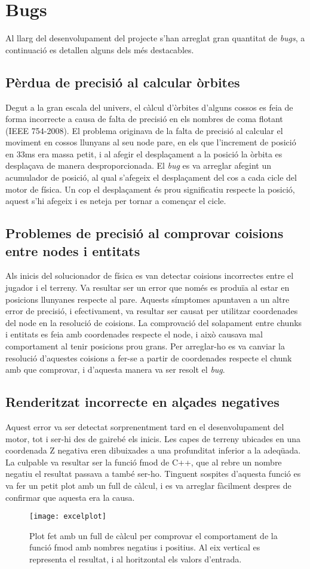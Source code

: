 \section{Bugs}
Al llarg del desenvolupament del projecte s'han arreglat gran quantitat de \textit{bugs}, a continuació es detallen alguns dels més destacables.
\subsection{Pèrdua de precisió al calcular òrbites}
Degut a la gran escala del univers, el càlcul d'òrbites d'alguns cossos es feia de forma incorrecte a causa de falta de precisió en els nombres de coma flotant (IEEE 754-2008).
El problema originava de la falta de precisió al calcular el moviment en cossos llunyans al seu node pare, en els que l'increment de posició en 33ms era massa petit, i al afegir el desplaçament a la posició la òrbita es desplaçava de manera desproporcionada.
El \textit{bug} es va arreglar afegint un acumulador de posició, al qual s'afegeix el desplaçament del cos a cada cicle del motor de física. Un cop el desplaçament és prou significatiu respecte la posició, aquest s'hi afegeix i es neteja per tornar a començar el cicle.
\subsection{Problemes de precisió al comprovar co\lgem isions entre nodes i entitats}
Als inicis del solucionador de física es van detectar co\lgem isions incorrectes entre el jugador i el terreny. Va resultar ser un error que només es produïa al estar en posicions llunyanes respecte al pare.
Aquests símptomes apuntaven a un altre error de precisió, i efectivament, va resultar ser causat per utilitzar coordenades del node en la resolució de co\lgem isions. La comprovació del solapament entre chunks i entitats es feia amb coordenades respecte el node, i això causava mal comportament al tenir posicions prou grans.
Per arreglar-ho es va canviar la resolució d'aquestes co\lgem isions a fer-se a partir de coordenades respecte el chunk amb que comprovar, i d'aquesta manera va ser resolt el \textit{bug}.
\subsection{Renderitzat incorrecte en alçades negatives}
Aquest error va ser detectat sorprenentment tard en el desenvolupament del motor, tot i ser-hi des de gairebé els inicis.
Les capes de terreny ubicades en una coordenada Z negativa eren dibuixades a una profunditat inferior a la adeqüada.
La culpable va resultar ser la funció fmod de C++, que al rebre un nombre negatiu el resultat passava a també ser-ho. Tinguent sospites d'aquesta funció es va fer un petit plot amb un full de càlcul, i es va arreglar fàcilment despres de confirmar que aquesta era la causa.
\begin{figure}[H]
  \centering
  \texttt{[image: excelplot]}
  \caption{Plot fet amb un full de càlcul per comprovar el comportament de la funció fmod amb nombres negatius i positius. Al eix vertical es representa el resultat, i al horitzontal els valors d'entrada.}
\end{figure}

